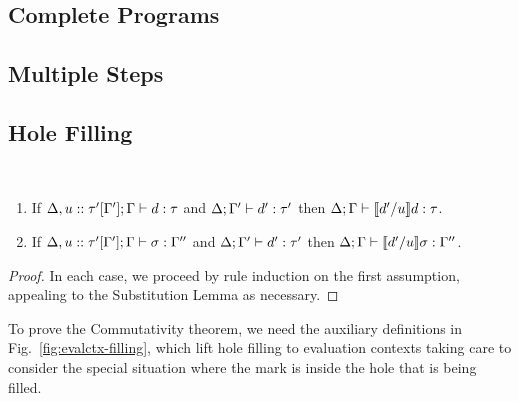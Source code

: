 

\subsection{Complete Programs}



\subsection{Multiple Steps}


\subsection{Hole Filling}\label{sec:hole-filling}
\begin{lem}[Filling] ~
  \begin{enumerate}[nolistsep]
  \item If $\Delta, u :: \tau'[\Gamma']; \Gamma \vdash d : \tau$
  and $\Delta; \Gamma' \vdash d' : \tau'$
  then $\Delta; \Gamma \vdash \llbracket d' / u\rrbracket d : \tau$.
  \item If $\Delta, u :: \tau'[\Gamma']; \Gamma \vdash \sigma : \Gamma''$
  and $\Delta; \Gamma' \vdash d' : \tau'$
  then $\Delta; \Gamma \vdash \llbracket d' / u\rrbracket \sigma : \Gamma''$.
  \end{enumerate}
\end{lem}
\begin{proof}
In each case, we proceed by rule induction on the first assumption, appealing to the Substitution Lemma as necessary.
\end{proof}

To prove the Commutativity theorem, we need the auxiliary definitions in Fig.~\ref{fig:evalctx-filling}, which lift hole filling to evaluation contexts taking care to consider the special situation where the mark is inside the hole that is being filled.


